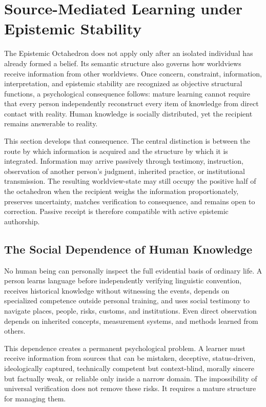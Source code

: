 \documentclass[11pt]{article}
\begin{document}
\section{Source-Mediated Learning under Epistemic Stability}

The Epistemic Octahedron does not apply only after an isolated individual has already formed a belief. Its semantic structure also governs how worldviews receive information from other worldviews. Once concern, constraint, information, interpretation, and epistemic stability are recognized as objective structural functions, a psychological consequence follows: mature learning cannot require that every person independently reconstruct every item of knowledge from direct contact with reality. Human knowledge is socially distributed, yet the recipient remains answerable to reality.

This section develops that consequence. The central distinction is between the route by which information is acquired and the structure by which it is integrated. Information may arrive passively through testimony, instruction, observation of another person's judgment, inherited practice, or institutional transmission. The resulting worldview-state may still occupy the positive half of the octahedron when the recipient weighs the information proportionately, preserves uncertainty, matches verification to consequence, and remains open to correction. Passive receipt is therefore compatible with active epistemic authorship.

\subsection{The Social Dependence of Human Knowledge}

No human being can personally inspect the full evidential basis of ordinary life. A person learns language before independently verifying linguistic convention, receives historical knowledge without witnessing the events, depends on specialized competence outside personal training, and uses social testimony to navigate places, people, risks, customs, and institutions. Even direct observation depends on inherited concepts, measurement systems, and methods learned from others.

This dependence creates a permanent psychological problem. A learner must receive information from sources that can be mistaken, deceptive, status-driven, ideologically captured, technically competent but context-blind, morally sincere but factually weak, or reliable only inside a narrow domain. The impossibility of universal verification does not remove these risks. It requires a mature structure for managing them.
\end{document}
